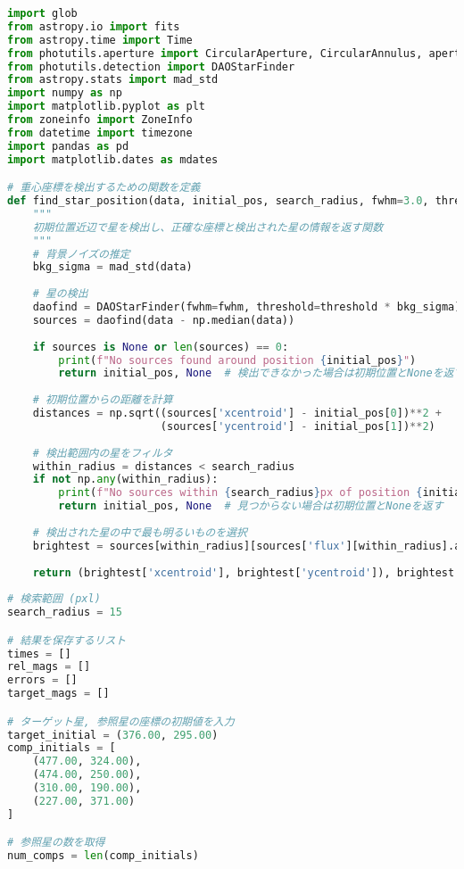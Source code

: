 \begin{lstlisting}[caption=開口測光用のコード, label=apphot, language=Python]
import glob
from astropy.io import fits
from astropy.time import Time
from photutils.aperture import CircularAperture, CircularAnnulus, aperture_photometry
from photutils.detection import DAOStarFinder
from astropy.stats import mad_std
import numpy as np
import matplotlib.pyplot as plt
from zoneinfo import ZoneInfo
from datetime import timezone
import pandas as pd
import matplotlib.dates as mdates

# 重心座標を検出するための関数を定義
def find_star_position(data, initial_pos, search_radius, fwhm=3.0, threshold=5.0):
    """
    初期位置近辺で星を検出し、正確な座標と検出された星の情報を返す関数
    """
    # 背景ノイズの推定
    bkg_sigma = mad_std(data)
    
    # 星の検出
    daofind = DAOStarFinder(fwhm=fwhm, threshold=threshold * bkg_sigma)
    sources = daofind(data - np.median(data))
    
    if sources is None or len(sources) == 0:
        print(f"No sources found around position {initial_pos}")
        return initial_pos, None  # 検出できなかった場合は初期位置とNoneを返す
    
    # 初期位置からの距離を計算
    distances = np.sqrt((sources['xcentroid'] - initial_pos[0])**2 + 
                        (sources['ycentroid'] - initial_pos[1])**2)
    
    # 検出範囲内の星をフィルタ
    within_radius = distances < search_radius
    if not np.any(within_radius):
        print(f"No sources within {search_radius}px of position {initial_pos}")
        return initial_pos, None  # 見つからない場合は初期位置とNoneを返す
    
    # 検出された星の中で最も明るいものを選択
    brightest = sources[within_radius][sources['flux'][within_radius].argmax()]
    
    return (brightest['xcentroid'], brightest['ycentroid']), brightest
    
# 検索範囲 (pxl) 
search_radius = 15

# 結果を保存するリスト
times = []
rel_mags = []
errors = []
target_mags = []

# ターゲット星, 参照星の座標の初期値を入力
target_initial = (376.00, 295.00)
comp_initials = [
    (477.00, 324.00), 
    (474.00, 250.00), 
    (310.00, 190.00), 
    (227.00, 371.00)
]

# 参照星の数を取得
num_comps = len(comp_initials)


\end{lstlisting}
